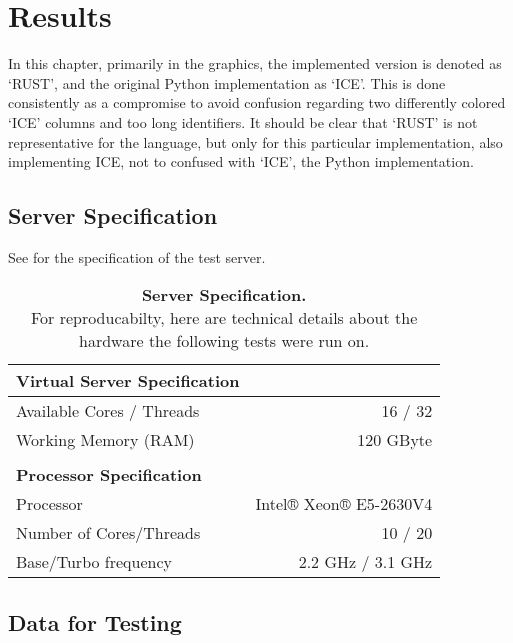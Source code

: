 \chapter{Results}\label{chap:results}

In this chapter, primarily in the graphics, the implemented version is denoted
as `RUST', and the original Python implementation as `ICE'. This is done
consistently as a compromise to avoid confusion regarding two differently
colored `ICE' columns and too long identifiers. It should be clear that `RUST'
is not representative for the language, but only for this particular
implementation, also implementing ICE, not to confused with `ICE', the Python
implementation.

\section{Server Specification}\label{sec:specs}

See  for the specification of the test server.

\begin{table}[ht]
    \begin{tabular}{@{}lr@{}}
        \textbf{Virtual Server Specification} & \\
        \midrule
        Available Cores / Threads & 16 / 32 \\
        Working Memory (RAM) & 120 GByte \\ \\
        \textbf{Processor Specification} & \\
        \midrule
        Processor & Intel® Xeon® E5-2630V4\footnotemark \\
        Number of Cores/Threads & 10 / 20 \\
        Base/Turbo frequency & 2.2 GHz / 3.1 GHz \\
    \end{tabular}
    \caption[Server Specification]
    {\textbf{Server Specification.} \\
    For reproducabilty, here are technical details about the hardware the
    following tests were run on.}
    \label{tab:specs}
\end{table}



\newpage
\section{Data for Testing}\label{sec:data}

